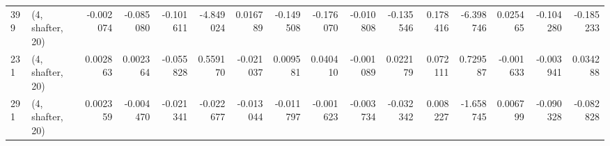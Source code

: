 \begin{tabular}{llrrrrrrrrrrrrrr}
399 &  (4, shafter, 20) &  -0.002074 & -0.085080 & -0.101611 &    -4.849024 &   0.016789 &  -0.149508 &  -0.176070 & -0.010808 & -0.135546 &  0.178416 &   -6.398746 &  0.025465 & -0.104280 & -0.185233 \\
231 &  (4, shafter, 20) &   0.002863 &  0.002364 & -0.055828 &     0.559170 &  -0.021037 &   0.009581 &   0.040410 & -0.001089 &  0.022179 &  0.072111 &    0.729587 & -0.001633 & -0.003941 &  0.034288 \\
291 &  (4, shafter, 20) &   0.002359 & -0.004470 & -0.021341 &    -0.022677 &  -0.013044 &  -0.011797 &  -0.001623 & -0.003734 & -0.032342 &  0.008227 &   -1.658745 &  0.006799 & -0.090328 & -0.082828 \\
\bottomrule
\end{tabular}
